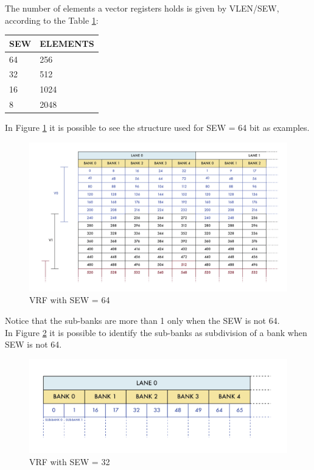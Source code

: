 The number of elements a vector registers holds is given by VLEN/SEW, according to the Table \ref{sew-el}:


\begin{table}[H]
    \centering
    \begin{tabular}{|l|l|}
    \hline
        \rowcolor[HTML]{C0C0C0} 
        SEW & ELEMENTS \\ \hline
        64  & 256      \\ \hline
        32  & 512      \\ \hline
        16  & 1024     \\ \hline
        8   & 2048     \\ \hline
    \end{tabular}
    \label{sew-el}
\end{table}

In Figure \ref{vrf-64} it is possible to see the structure used for SEW = 64 bit as examples.
\begin{figure}[H]
    \centering
    \includegraphics[scale = 0.45]{Chapter_1/img/vrf-64.png}
    \caption{VRF with SEW = 64}
    \label{vrf-64}
\end{figure}

Notice that the sub-banks are more than 1 only when the SEW is not 64. \\

In Figure \ref{vrf-32} it is possible to identify the sub-banks as subdivision of a bank when SEW is not 64.
\begin{figure}[H]
    \centering
    \includegraphics[scale = 0.7]{Chapter_1/img/vrf-32.png}
    \caption{VRF with SEW = 32}
    \label{vrf-32}
\end{figure}


